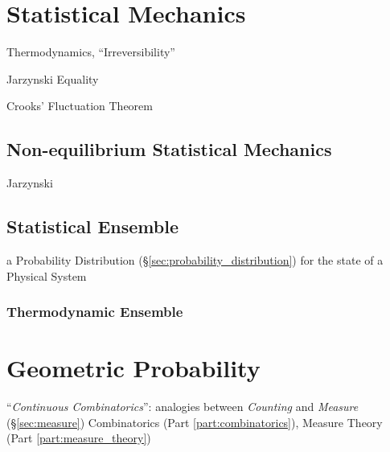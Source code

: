 \section{Statistical Mechanics}\label{sec:statistical_mechanics}

Thermodynamics, ``Irreversibility''

Jarzynski Equality

Crooks' Fluctuation Theorem



\subsection{Non-equilibrium Statistical Mechanics}
\label{sec:nonequilibrium_statistical_mechanics}

Jarzynski



\subsection{Statistical Ensemble}\label{sec:statistical_ensemble}

a Probability Distribution (\S\ref{sec:probability_distribution}) for the state
of a Physical System



\subsubsection{Thermodynamic Ensemble}\label{sec:thermodynamic_ensemble}



\section{Geometric Probability}\label{sec:geometric_probability}

``\emph{Continuous Combinatorics}'': analogies between \emph{Counting} and
\emph{Measure} (\S\ref{sec:measure}) \fist Combinatorics (Part
\ref{part:combinatorics}), Measure Theory (Part \ref{part:measure_theory})



